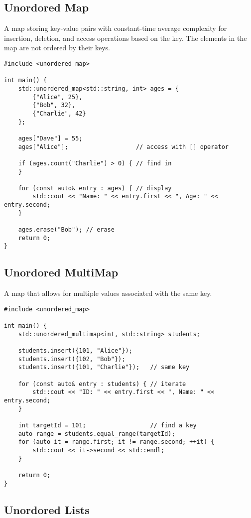 \documentclass[openany]{report}
\begin{document}
\subsection{Unordored Map}

A map storing key-value pairs with constant-time average complexity for insertion,
deletion, and access operations based on the key.
The elements in the map are not ordered by their keys.

\begin{verbatim}
#include <unordered_map>

int main() {
    std::unordered_map<std::string, int> ages = {
        {"Alice", 25},
        {"Bob", 32},
        {"Charlie", 42}
    };

    ages["Dave"] = 55;
    ages["Alice"];                   // access with [] operator

    if (ages.count("Charlie") > 0) { // find in
    }

    for (const auto& entry : ages) { // display
        std::cout << "Name: " << entry.first << ", Age: " << entry.second;
    }

    ages.erase("Bob"); // erase
    return 0;
}
\end{verbatim}

\subsection{Unordored MultiMap}

A map that allows for multiple values associated with the same key. 

\begin{verbatim}
#include <unordered_map>

int main() {
    std::unordered_multimap<int, std::string> students;

    students.insert({101, "Alice"});
    students.insert({102, "Bob"});
    students.insert({101, "Charlie"});   // same key

    for (const auto& entry : students) { // iterate 
        std::cout << "ID: " << entry.first << ", Name: " << entry.second;
    }

    int targetId = 101;                  // find a key
    auto range = students.equal_range(targetId);
    for (auto it = range.first; it != range.second; ++it) { 
        std::cout << it->second << std::endl;
    }

    return 0;
}
\end{verbatim}

\subsection{Unordored Lists}
\end{document}
